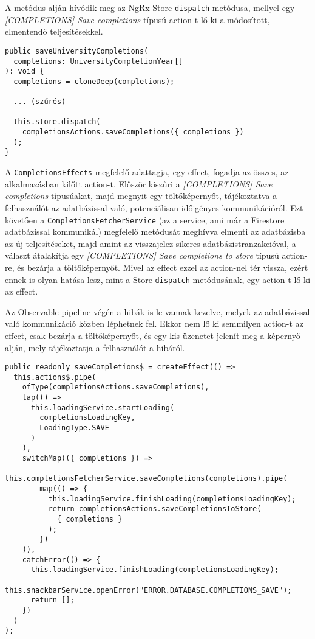 \documentclass[a4paper,12pt]{report}
\begin{document}
A metódus alján hívódik meg az NgRx Store \verb|dispatch| metódusa, mellyel egy \textit{[COMPLETIONS] Save completions} típusú action-t lő ki a módosított, elmentendő teljesítésekkel.

\pagebreak
\begin{samepage}
    \begin{verbatim}
public saveUniversityCompletions(
  completions: UniversityCompletionYear[]
): void {
  completions = cloneDeep(completions);

  ... (szűrés)

  this.store.dispatch(
    completionsActions.saveCompletions({ completions })
  );
}
    \end{verbatim}
\end{samepage}

A \verb|CompletionsEffects| megfelelő adattagja, egy effect, fogadja az összes, az alkalmazásban kilőtt action-t. Először kiszűri a \textit{[COMPLETIONS] Save completions} típusúakat, majd megnyit egy töltőképernyőt, tájékoztatva a felhasználót az adatbázissal való, potenciálisan időigényes kommunikációról. Ezt követően a \verb|CompletionsFetcherService| (az a service, ami már a Firestore adatbázissal kommunikál) megfelelő metódusát meghívva elmenti az adatbázisba az új teljesítéseket, majd amint az visszajelez sikeres adatbázistranzakcióval, a választ átalakítja egy \textit{[COMPLETIONS] Save completions to store} típusú action-re, és bezárja a töltőképernyőt. Mivel az effect ezzel az action-nel tér vissza, ezért ennek is olyan hatása lesz, mint a Store \verb|dispatch| metódusának, egy action-t lő ki az effect.

Az Observable pipeline végén a hibák is le vannak kezelve, melyek az adatbázissal való kommunikáció közben léphetnek fel. Ekkor nem lő ki semmilyen action-t az effect, csak bezárja a töltőképernyőt, és egy kis üzenetet jelenít meg a képernyő alján, mely tájékoztatja a felhasználót a hibáról.

\pagebreak
\begin{samepage}
    \begin{verbatim}
public readonly saveCompletions$ = createEffect(() =>
  this.actions$.pipe(
    ofType(completionsActions.saveCompletions),
    tap(() => 
      this.loadingService.startLoading(
        completionsLoadingKey,
        LoadingType.SAVE
      )
    ),
    switchMap(({ completions }) =>
      this.completionsFetcherService.saveCompletions(completions).pipe(
        map(() => {
          this.loadingService.finishLoading(completionsLoadingKey);
          return completionsActions.saveCompletionsToStore(
            { completions }
          );
        })
    )),
    catchError(() => {
      this.loadingService.finishLoading(completionsLoadingKey);
      this.snackbarService.openError("ERROR.DATABASE.COMPLETIONS_SAVE");
      return [];
    })
  )
);
    \end{verbatim}
\end{samepage}
\end{document}
